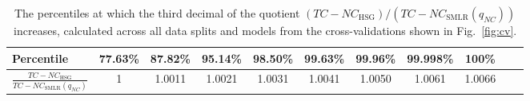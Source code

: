 \documentclass[preprint,5p,times,11pt]{elsarticle}
\begin{document}
\begin{table*}
\centering
\caption{
The percentiles at which the third decimal of the quotient $\left(TC - NC_{\text{HSG}}\right) / \left(TC - NC_{\text{SMLR}}(q_{NC})\right)$ increases, calculated across all data splits and models from the cross-validations shown in Fig.~\ref{fig:cv}.
}
\label{tab:AC_prop}
\vspace{1mm}
\begin{tabular}{l*{10}{c}}
Percentile             & 77.63\% & 87.82\% & 95.14\% & 98.50\% & 99.63\% & 99.96\% & 99.998\% & 100\% \\
\hline
$\frac{TC - NC_{\text{HSG}}}{TC - NC_{\text{SMLR}}(q_{NC})}$ & 1 & 1.0011 & 1.0021 & 1.0031 & 1.0041 & 1.0050 & 1.0061 & 1.0066 \\
\end{tabular}
\end{table*}


\newpage
\end{document}
